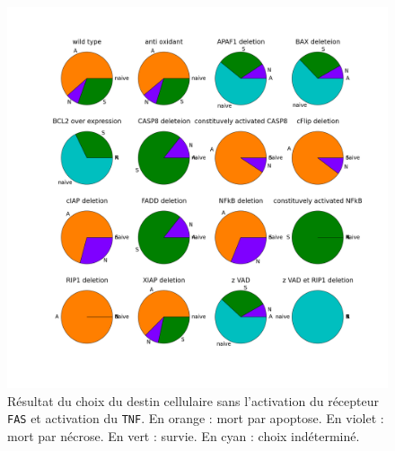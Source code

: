 \documentclass[11pt, a4paper]{article}
\begin{document}
\begin{figure}[position]
    \begin{center}
        \includegraphics[scale=0.25]{tnf1_fas0}
        \caption{
            \label{tnf1_fas0}
            Résultat du choix du destin cellulaire sans l'activation du
            récepteur \texttt{FAS} et activation du \texttt{TNF}. En orange :
            mort par apoptose. En violet : mort par nécrose. En vert : survie.
            En cyan : choix indéterminé.
        }
    \end{center}
\end{figure}
\end{document}
